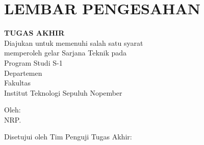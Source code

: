 \chapter*{LEMBAR PENGESAHAN}

\thispagestyle{empty}

\begin{center}
  \textbf{\tatitle{}}
\end{center}

\begingroup
\small

\begin{center}
  \textbf{TUGAS AKHIR}
  \\Diajukan untuk memenuhi salah satu syarat \\
  memperoleh gelar Sarjana Teknik pada \\
  Program Studi S-1 \studyprogram{} \\
  Departemen \department{} \\
  Fakultas \faculty{} \\
  Institut Teknologi Sepuluh Nopember
\end{center}

\begin{center}
  Oleh: \textbf{\name{}}
  \\NRP. \nrp{}
\end{center}

\begin{center}
  Disetujui oleh Tim Penguji Tugas Akhir:
\end{center}

\begingroup
\setlength{\tabcolsep}{0pt}

